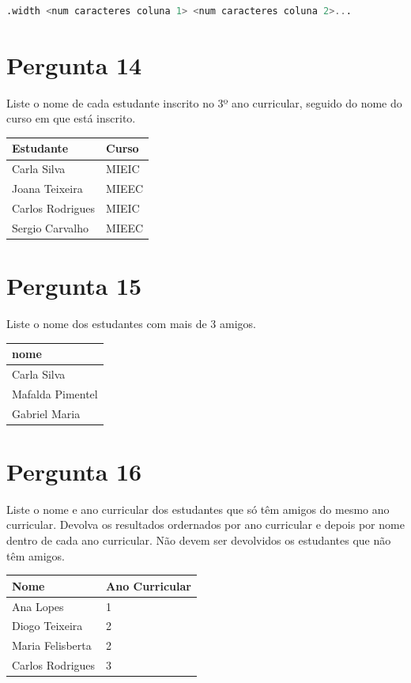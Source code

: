 \documentclass[type=normal, year=2015/16]{bdad_exam}
\begin{document}
{\begin{lstlisting}[language=SQL,numbers=none]
.width <num caracteres coluna 1> <num caracteres coluna 2>...
\end{lstlisting}

\section{Pergunta 14}
Liste o nome de cada estudante inscrito no 3º ano curricular, seguido do nome do curso em que está inscrito.
\begin{center} \begin{tabular}{l | l}
    \textbf{Estudante} & \textbf{Curso} \\ \hline
    Carla Silva        & MIEIC          \\
    Joana Teixeira     & MIEEC          \\
    Carlos Rodrigues   & MIEIC          \\
    Sergio Carvalho    & MIEEC
\end{tabular} \end{center}
\ansseparator


\section{Pergunta 15}
Liste o nome dos estudantes com mais de 3 amigos.
\begin{center} \begin{tabular}{l}
    \textbf{nome}    \\ \hline
    Carla Silva      \\
    Mafalda Pimentel \\
    Gabriel Maria
\end{tabular} \end{center}


\section{Pergunta 16}
Liste o nome e ano curricular dos estudantes que só têm amigos do mesmo ano curricular. Devolva os resultados ordernados por ano curricular e depois por nome dentro de cada ano curricular. Não devem ser devolvidos os estudantes que não têm amigos.
\begin{center} \begin{tabular}{l | l}
    \textbf{Nome}    & \textbf{Ano Curricular} \\ \hline
    Ana Lopes        & 1                       \\
    Diogo Teixeira   & 2                       \\
    Maria Felisberta & 2                       \\
    Carlos Rodrigues & 3
\end{tabular} \end{center}


}
\end{document}

